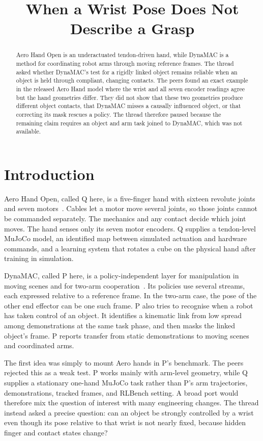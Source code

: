 \documentclass{article}
\title{When a Wrist Pose Does Not Describe a Grasp}
\author{}
\date{}
\begin{document}
\maketitle

\begin{abstract}
Aero Hand Open is an underactuated tendon-driven hand, while DynaMAC is a method for coordinating robot arms through moving reference frames.  The thread asked whether DynaMAC's test for a rigidly linked object remains reliable when an object is held through compliant, changing contacts.  The peers found an exact example in the released Aero Hand model where the wrist and all seven encoder readings agree but the hand geometries differ.  They did not show that these two geometries produce different object contacts, that DynaMAC misses a causally influenced object, or that correcting its mask rescues a policy.  The thread therefore paused because the remaining claim requires an object and arm task joined to DynaMAC, which was not available.
\end{abstract}

\section{Introduction}

Aero Hand Open, called Q here, is a five-finger hand with sixteen revolute joints and seven motors~\cite{qpaper}.  Cables let a motor move several joints, so those joints cannot be commanded separately.  The mechanics and any contact decide which joint moves.  The hand senses only its seven motor encoders.  Q supplies a tendon-level MuJoCo model, an identified map between simulated actuation and hardware commands, and a learning system that rotates a cube on the physical hand after training in simulation.

DynaMAC, called P here, is a policy-independent layer for manipulation in moving scenes and for two-arm cooperation~\cite{ppaper}.  Its policies use several streams, each expressed relative to a reference frame.  In the two-arm case, the pose of the other end effector can be one such frame.  P also tries to recognise when a robot has taken control of an object.  It identifies a kinematic link from low spread among demonstrations at the same task phase, and then masks the linked object's frame.  P reports transfer from static demonstrations to moving scenes and coordinated arms.

The first idea was simply to mount Aero hands in P's benchmark.  The peers rejected this as a weak test.  P works mainly with arm-level geometry, while Q supplies a stationary one-hand MuJoCo task rather than P's arm trajectories, demonstrations, tracked frames, and RLBench setting.  A broad port would therefore mix the question of interest with many engineering changes.  The thread instead asked a precise question: can an object be strongly controlled by a wrist even though its pose relative to that wrist is not nearly fixed, because hidden finger and contact states change?
\end{document}
